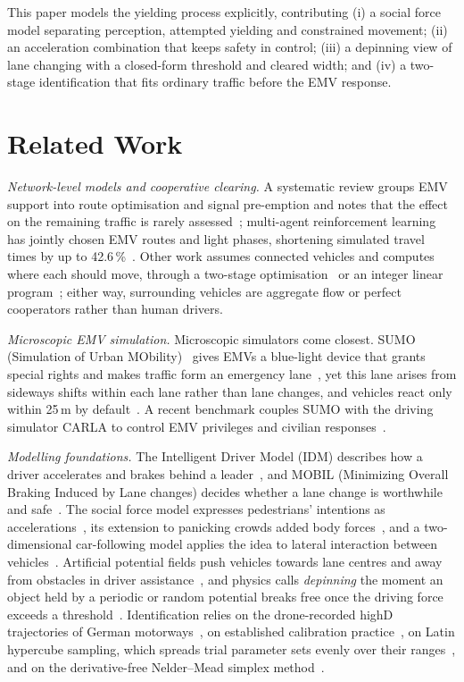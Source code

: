 \documentclass[conference,a4paper]{IEEEtran}
\begin{document}
This paper models the yielding process explicitly, contributing (i) a social force model separating perception, attempted yielding and constrained movement; (ii) an acceleration combination that keeps safety in control; (iii) a depinning view of lane changing with a closed-form threshold and cleared width; and (iv) a two-stage identification that fits ordinary traffic before the EMV response.

\section{Related Work}
\emph{Network-level models and cooperative clearing.} A systematic review groups EMV support into route optimisation and signal pre-emption and notes that the effect on the remaining traffic is rarely assessed~\cite{humagain20}; multi-agent reinforcement learning has jointly chosen EMV routes and light phases, shortening simulated travel times by up to 42.6\,\%~\cite{su23}. Other work assumes connected vehicles and computes where each should move, through a two-stage optimisation~\cite{wu20} or an integer linear program~\cite{hannoun19}; either way, surrounding vehicles are aggregate flow or perfect cooperators rather than human drivers.

\emph{Microscopic EMV simulation.} Microscopic simulators come closest. SUMO (Simulation of Urban MObility)~\cite{lopez18} gives EMVs a blue-light device that grants special rights and makes traffic form an emergency lane~\cite{biekerwalz18}, yet this lane arises from sideways shifts within each lane rather than lane changes, and vehicles react only within 25\,m by default~\cite{sumodoc}. A recent benchmark couples SUMO with the driving simulator CARLA to control EMV privileges and civilian responses~\cite{zhu26}.

\emph{Modelling foundations.} The Intelligent Driver Model (IDM) describes how a driver accelerates and brakes behind a leader~\cite{treiber00}, and MOBIL (Minimizing Overall Braking Induced by Lane changes) decides whether a lane change is worthwhile and safe~\cite{kesting07}. The social force model expresses pedestrians' intentions as accelerations~\cite{helbing95}, its extension to panicking crowds added body forces~\cite{helbing00}, and a two-dimensional car-following model applies the idea to lateral interaction between vehicles~\cite{delpiano20}. Artificial potential fields push vehicles towards lane centres and away from obstacles in driver assistance~\cite{gerdes01,wolf08}, and physics calls \emph{depinning} the moment an object held by a periodic or random potential breaks free once the driving force exceeds a threshold~\cite{fisher98}. Identification relies on the drone-recorded highD trajectories of German motorways~\cite{krajewski18}, on established calibration practice~\cite{punzo21}, on Latin hypercube sampling, which spreads trial parameter sets evenly over their ranges~\cite{mckay79}, and on the derivative-free Nelder--Mead simplex method~\cite{nelder65}.
\end{document}
